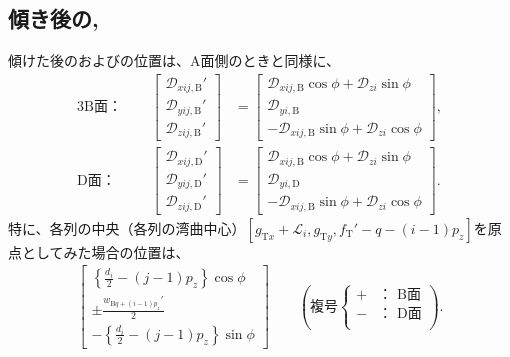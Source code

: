 \subsection{傾き後の\BfaceDimple, \DfaceDimple}
傾けた後の\BFaceDimpleIRowJ および\DFaceDimpleIRowJ の位置は、A面側のときと同様に、
\begin{alignat*}{3}
  \text{B面：}&~~&
  \left[
    \begin{array}{c}
      \mathcal D_{xij,\mathrm B}'\\
      \mathcal D_{yij,\mathrm B}'\\
      \mathcal D_{zij,\mathrm B}'
    \end{array}
  \right]
 &= \left[
    \begin{array}{c}
      \mathcal D_{xij,\mathrm B}\cos\phi+\mathcal D_{zi}\sin\phi\\
      \mathcal D_{yi,\mathrm B}\\
      -\mathcal D_{xij,\mathrm B}\sin\phi+\mathcal D_{zi}\cos\phi
    \end{array}
    \right],\\[2pt]
  \text{D面：}&~~&
  \left[
    \begin{array}{c}
      \mathcal D_{xij,\mathrm D}'\\
      \mathcal D_{yij,\mathrm D}'\\
      \mathcal D_{zij,\mathrm D}'
    \end{array}
  \right]
 &= \left[
    \begin{array}{c}
      \mathcal D_{xij,\mathrm B}\cos\phi+\mathcal D_{zi}\sin\phi\\
      \mathcal D_{yi,\mathrm D}\\
      -\mathcal D_{xij,\mathrm B}\sin\phi+\mathcal D_{zi}\cos\phi
    \end{array}
    \right].
\end{alignat*}
特に、各列の中央（各列の湾曲中心）$[g_{\mathrm Tx}+\mathcal L_i, g_{\mathrm Ty}, f_\mathrm T'-q-(i-1)p_z]$を原点としてみた場合の位置は、
\begin{align*}
  \left[
  \begin{array}{c}
    \displaystyle \left\{\frac{d_i}2-(j-1)p_z\right\}\cos\phi\\
    \displaystyle \pm\frac{w_{\mathrm Bq+(i-1)p_z}'}2\\
    \displaystyle -\left\{\frac{d_i}2-(j-1)p_z\right\}\sin\phi
  \end{array}
  \right]\qquad
  \left(
  \text{複号}
  \left\{
  \begin{array}{rl}
    \!+\!\!\!\!& \text{： B面}\\
    \!-\!\!\!\!& \text{： D面}\\
  \end{array}
  \right.
  \right).
\end{align*}

